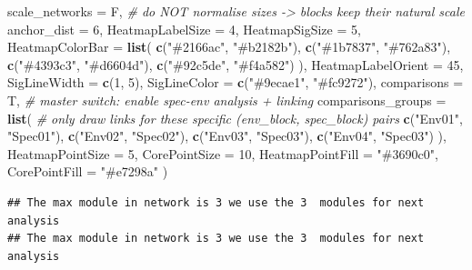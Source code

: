 \documentclass[
]{book}
\newenvironment{Shaded}{\begin{snugshade}}{\end{snugshade}}
\newcommand{\AttributeTok}[1]{\textcolor[rgb]{0.13,0.29,0.53}{#1}}
\newcommand{\CommentTok}[1]{\textcolor[rgb]{0.56,0.35,0.01}{\textit{#1}}}
\newcommand{\DecValTok}[1]{\textcolor[rgb]{0.00,0.00,0.81}{#1}}
\newcommand{\FunctionTok}[1]{\textcolor[rgb]{0.13,0.29,0.53}{\textbf{#1}}}
\newcommand{\NormalTok}[1]{#1}
\newcommand{\StringTok}[1]{\textcolor[rgb]{0.31,0.60,0.02}{#1}}
\begin{document}
\begin{Shaded}
\begin{Highlighting}[]
  \AttributeTok{scale\_networks     =}\NormalTok{ F,                }\CommentTok{\# do NOT normalise sizes {-}\textgreater{} blocks keep their natural scale}
  \AttributeTok{anchor\_dist        =} \DecValTok{6}\NormalTok{,}
  \AttributeTok{HeatmapLabelSize   =} \DecValTok{4}\NormalTok{,}
  \AttributeTok{HeatmapSigSize     =} \DecValTok{5}\NormalTok{,}
  \AttributeTok{HeatmapColorBar    =} \FunctionTok{list}\NormalTok{(}
    \FunctionTok{c}\NormalTok{(}\StringTok{"\#2166ac"}\NormalTok{, }\StringTok{"\#b2182b"}\NormalTok{),}
    \FunctionTok{c}\NormalTok{(}\StringTok{"\#1b7837"}\NormalTok{, }\StringTok{"\#762a83"}\NormalTok{),}
    \FunctionTok{c}\NormalTok{(}\StringTok{"\#4393c3"}\NormalTok{, }\StringTok{"\#d6604d"}\NormalTok{),}
    \FunctionTok{c}\NormalTok{(}\StringTok{"\#92c5de"}\NormalTok{, }\StringTok{"\#f4a582"}\NormalTok{)}
\NormalTok{  ),}
  \AttributeTok{HeatmapLabelOrient =} \DecValTok{45}\NormalTok{,}
  \AttributeTok{SigLineWidth       =} \FunctionTok{c}\NormalTok{(}\DecValTok{1}\NormalTok{, }\DecValTok{5}\NormalTok{),}
  \AttributeTok{SigLineColor       =} \FunctionTok{c}\NormalTok{(}\StringTok{"\#9ecae1"}\NormalTok{, }\StringTok{"\#fc9272"}\NormalTok{),}
  \AttributeTok{comparisons        =}\NormalTok{ T,                }\CommentTok{\# master switch: enable spec{-}env analysis + linking}
  \AttributeTok{comparisons\_groups =} \FunctionTok{list}\NormalTok{(             }\CommentTok{\# only draw links for these specific (env\_block, spec\_block) pairs}
    \FunctionTok{c}\NormalTok{(}\StringTok{"Env01"}\NormalTok{, }\StringTok{"Spec01"}\NormalTok{),}
    \FunctionTok{c}\NormalTok{(}\StringTok{"Env02"}\NormalTok{, }\StringTok{"Spec02"}\NormalTok{),}
    \FunctionTok{c}\NormalTok{(}\StringTok{"Env03"}\NormalTok{, }\StringTok{"Spec03"}\NormalTok{),}
    \FunctionTok{c}\NormalTok{(}\StringTok{"Env04"}\NormalTok{, }\StringTok{"Spec03"}\NormalTok{)}
\NormalTok{  ),}
  \AttributeTok{HeatmapPointSize   =} \DecValTok{5}\NormalTok{,}
  \AttributeTok{CorePointSize      =} \DecValTok{10}\NormalTok{,}
  \AttributeTok{HeatmapPointFill   =} \StringTok{"\#3690c0"}\NormalTok{,}
  \AttributeTok{CorePointFill      =} \StringTok{"\#e7298a"}
\NormalTok{)}
\end{Highlighting}
\end{Shaded}

\begin{verbatim}
## The max module in network is 3 we use the 3  modules for next analysis
## The max module in network is 3 we use the 3  modules for next analysis
\end{verbatim}
\end{document}
